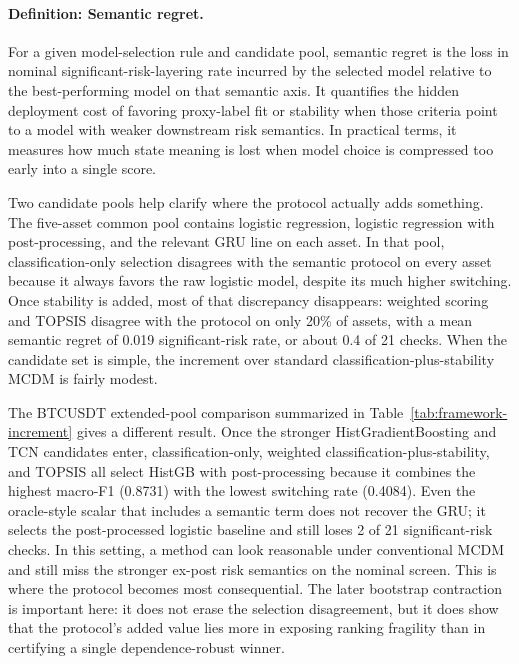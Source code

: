 \documentclass[a4paper,fleqn]{cas-dc}
\begin{document}
\paragraph{Definition: Semantic regret.}
For a given model-selection rule and candidate pool, semantic regret is the loss in nominal significant-risk-layering rate incurred by the selected model relative to the best-performing model on that semantic axis. It quantifies the hidden deployment cost of favoring proxy-label fit or stability when those criteria point to a model with weaker downstream risk semantics. In practical terms, it measures how much state meaning is lost when model choice is compressed too early into a single score.

Two candidate pools help clarify where the protocol actually adds something. The five-asset common pool contains logistic regression, logistic regression with post-processing, and the relevant GRU line on each asset. In that pool, classification-only selection disagrees with the semantic protocol on every asset because it always favors the raw logistic model, despite its much higher switching. Once stability is added, most of that discrepancy disappears: weighted scoring and TOPSIS disagree with the protocol on only 20\% of assets, with a mean semantic regret of 0.019 significant-risk rate, or about 0.4 of 21 checks. When the candidate set is simple, the increment over standard classification-plus-stability MCDM is fairly modest.

The BTCUSDT extended-pool comparison summarized in Table~\ref{tab:framework-increment} gives a different result. Once the stronger HistGradientBoosting and TCN candidates enter, classification-only, weighted classification-plus-stability, and TOPSIS all select HistGB with post-processing because it combines the highest macro-F1 (0.8731) with the lowest switching rate (0.4084). Even the oracle-style scalar that includes a semantic term does not recover the GRU; it selects the post-processed logistic baseline and still loses 2 of 21 significant-risk checks. In this setting, a method can look reasonable under conventional MCDM and still miss the stronger ex-post risk semantics on the nominal screen. This is where the protocol becomes most consequential. The later bootstrap contraction is important here: it does not erase the selection disagreement, but it does show that the protocol's added value lies more in exposing ranking fragility than in certifying a single dependence-robust winner.
\end{document}
